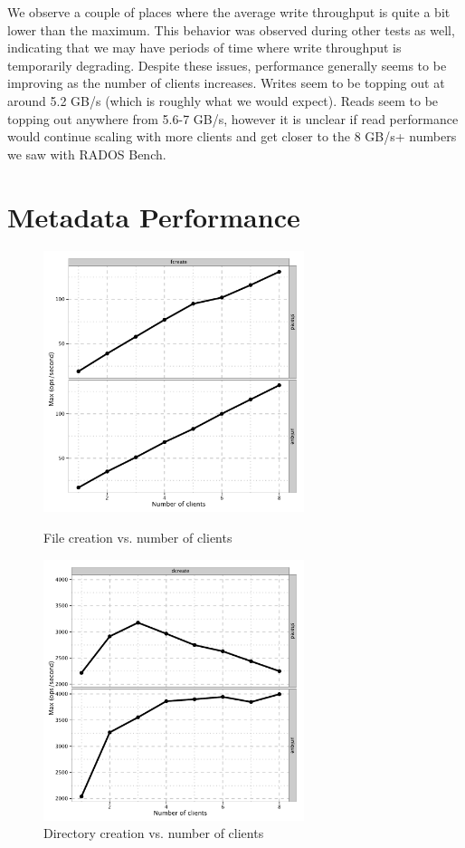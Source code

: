 \documentclass{article}
\begin{document}
We observe a couple of places where the average write throughput is quite a
bit lower than the maximum.  This behavior was observed during other tests as well,
indicating that we may have periods of time where write throughput is
temporarily degrading.  Despite these issues, performance generally seems to be
improving as the number of clients increases.  Writes seem to be topping out at
around 5.2 GB/s (which is roughly what we would expect).  Reads seem to be
topping out anywhere from 5.6-7 GB/s, however it is unclear if read performance
would continue scaling with more clients and get closer to the 8 GB/s+ numbers we
saw with RADOS Bench.


\section{Metadata Performance}

\begin{figure}[htb]
\centering
\begin{minipage}[t]{0.5\linewidth}
\centering
\includegraphics[width=3in]{data/mdtest-fcreate}
\caption{File creation vs.  number of clients}
\label{fig:mdtest-fcreate}
\end{minipage}%
\begin{minipage}[t]{0.5\linewidth}
\centering
\includegraphics[width=3in]{data/mdtest-dcreate}
\caption{Directory creation vs. number of clients}
\label{fig:mdtest-dcreate}
\end{minipage}%
\end{figure}
\end{document}
